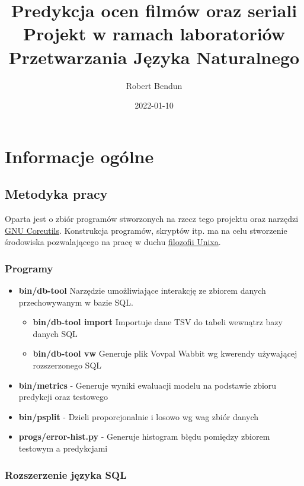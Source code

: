 \documentclass{article}
\title{Predykcja ocen filmów oraz seriali\\ \large Projekt w ramach laboratoriów Przetwarzania Języka Naturalnego}
\author{Robert Bendun}
\date{2022-01-10}
\begin{document}
\maketitle

\tableofcontents

\pagebreak

\section{Informacje ogólne}

\subsection{Metodyka pracy} \label{metodyka}

Oparta jest o zbiór programów stworzonych na rzecz tego projektu oraz narzędzi \href{https://www.gnu.org/software/coreutils/}{GNU Coreutils}. Konstrukcja programów, skryptów itp. ma na celu stworzenie środowiska pozwalającego na pracę w duchu \href{https://en.wikipedia.org/wiki/Unix_philosophy}{filozofii Unixa}.

\subsubsection{Programy}

\begin{itemize}
\item \textbf{bin/db-tool} Narzędzie umożliwiające interakcję ze zbiorem danych przechowywanym w bazie SQL.
	\begin{itemize}
		\item \textbf{bin/db-tool import} Importuje dane TSV do tabeli wewnątrz bazy danych SQL
		\item \textbf{bin/db-tool vw} Generuje plik Vovpal Wabbit wg kwerendy używającej rozszerzonego SQL
	\end{itemize}
\item \textbf{bin/metrics} - Generuje wyniki ewaluacji modelu na podstawie zbioru predykcji oraz testowego
\item \textbf{bin/psplit} - Dzieli proporcjonalnie i losowo wg wag zbiór danych
\item \textbf{progs/error-hist.py} - Generuje histogram błędu pomiędzy zbiorem testowym a predykcjami
\end{itemize}

\subsubsection{Rozszerzenie języka SQL}
\end{document}

